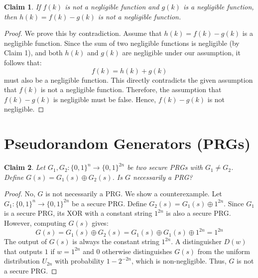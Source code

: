 \documentclass{article}
\newtheorem{claim}{Claim}
\begin{document}
\begin{claim}
If $f(k)$ is not a negligible function and $g(k)$ is a negligible function, then $h(k) = f(k) - g(k)$ is not a negligible function.
\end{claim}
\begin{proof}
We prove this by contradiction. Assume that $h(k) = f(k) - g(k)$ is a negligible function. 
Since the sum of two negligible functions is negligible (by Claim 1), and both $h(k)$ and $g(k)$ are negligible under our assumption, it follows that:
\[
f(k) = h(k) + g(k)
\]
must also be a negligible function.
This directly contradicts the given assumption that $f(k)$ is not a negligible function. Therefore, the assumption that $f(k) - g(k)$ is negligible must be false. Hence, $f(k) - g(k)$ is not negligible.
\end{proof}

\section{Pseudorandom Generators (PRGs)}

\begin{claim}
Let $G_1, G_2 : \{0, 1\}^n \to \{0, 1\}^{2n}$ be two secure PRGs with $G_1 \neq G_2$. Define $G(s) = G_1(s) \oplus G_2(s)$. Is $G$ necessarily a PRG?
\end{claim}
\begin{proof}
No, $G$ is not necessarily a PRG. We show a counterexample.
Let $G_1 : \{0,1\}^n \to \{0,1\}^{2n}$ be a secure PRG. Define $G_2(s) = G_1(s) \oplus 1^{2n}$. Since $G_1$ is a secure PRG, its XOR with a constant string $1^{2n}$ is also a secure PRG. However, computing $G(s)$ gives:
\[
G(s) = G_1(s) \oplus G_2(s) = G_1(s) \oplus G_1(s) \oplus 1^{2n} = 1^{2n}
\]
The output of $G(s)$ is always the constant string $1^{2n}$. A distinguisher $D(w)$ that outputs $1$ if $w = 1^{2n}$ and $0$ otherwise distinguishes $G(s)$ from the uniform distribution $U_{2n}$ with probability $1 - 2^{-2n}$, which is non-negligible. Thus, $G$ is not a secure PRG.
\end{proof}
\end{document}
